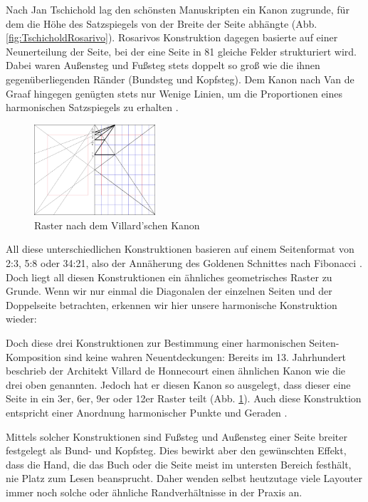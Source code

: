 \documentclass[12pt,a4paper]{article}
\begin{document}

Nach Jan Tschichold lag den schönsten Manuskripten ein Kanon zugrunde, für dem die Höhe des Satzspiegels von der Breite der Seite abhängte (Abb. \ref{fig:TschicholdRosarivo}). Rosarivos Konstruktion dagegen basierte auf einer Neunerteilung der Seite, bei der eine Seite in 81 gleiche Felder strukturiert wird. Dabei waren Außensteg und Fußsteg stets doppelt so groß wie die ihnen gegenüberliegenden Ränder (Bundsteg und Kopfsteg). Dem Kanon nach Van de Graaf hingegen genügten stets nur Wenige Linien, um die Proportionen eines harmonischen Satzspiegels zu erhalten \citep[S.~44]{gestaltungsPrinzipien}.

\begin{figure}
\includegraphics[width=0.4\textwidth]{Bilder/villard.png}
\caption{Raster nach dem Villard'schen Kanon}
\label{fig:vil}
\end{figure}

All diese unterschiedlichen Konstruktionen basieren auf einem Seitenformat von 2:3, 5:8 oder 34:21, also der Annäherung des Goldenen Schnittes nach Fibonacci \citep{format}. Doch liegt all diesen Konstruktionen ein ähnliches geometrisches Raster zu Grunde. Wenn wir nur einmal die Diagonalen der einzelnen Seiten und der Doppelseite betrachten, erkennen wir hier unsere harmonische Konstruktion wieder:

Doch diese drei Konstruktionen zur Bestimmung einer harmonischen Seiten-Komposition sind keine wahren Neuentdeckungen: Bereits im 13. Jahrhundert beschrieb der Architekt Villard de Honnecourt einen ähnlichen Kanon wie die drei oben genannten. Jedoch hat er diesen Kanon so ausgelegt, dass dieser eine Seite in ein 3er, 6er, 9er oder 12er Raster teilt (Abb. \ref{fig:vil}). Auch diese Konstruktion entspricht einer Anordnung harmonischer Punkte und Geraden \citep[S.~28]{villard}.

Mittels solcher Konstruktionen sind Fußsteg und Außensteg einer Seite breiter festgelegt als Bund- und Kopfsteg. Dies bewirkt aber den gewünschten Effekt, dass die Hand, die das Buch oder die Seite meist im untersten Bereich festhält, nie Platz zum Lesen beansprucht. Daher wenden selbst heutzutage viele Layouter immer noch solche oder ähnliche Randverhältnisse in der Praxis an.
\end{document}
